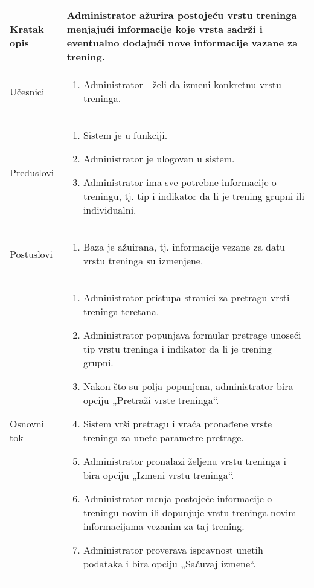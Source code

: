 \documentclass[../main.tex]{subfiles}
\begin{document}
\begin{longtable}{| p{} | p{} |} 

\hline
    Kratak opis &  Administrator ažurira postojeću vrstu treninga menjajući informacije koje vrsta sadrži i eventualno dodajući nove informacije vazane za trening.\\ 
\hline    
    Učesnici & 
    	\begin{enumerate}
        \item Administrator - želi da izmeni konkretnu vrstu treninga.
     \end{enumerate}\\
\hline
   Preduslovi & \begin{enumerate}
       \item Sistem je u funkciji.
       \item Administrator je ulogovan u sistem.
       \item Administrator ima sve potrebne informacije o treningu, tj. tip i indikator da li je trening grupni ili individualni.
   \end{enumerate}\\
\hline  
    Postuslovi & \begin{enumerate}
        \item Baza je ažuirana, tj. informacije vezane za datu vrstu treninga su izmenjene.
    \end{enumerate}\\
\hline
    Osnovni tok & \begin{enumerate}
        \item Administrator pristupa stranici za pretragu vrsti treninga teretana.
        \item Administrator popunjava formular pretrage unoseći tip vrstu treninga i indikator da li je trening grupni.
        \item Nakon što su polja popunjena, administrator bira opciju „Pretraži vrste treninga“.
        \item Sistem vrši pretragu i vraća pronađene vrste treninga za unete parametre pretrage.
        \item Administrator pronalazi željenu vrstu treninga i bira opciju „Izmeni vrstu treninga“.
        \item Administrator menja postojeće informacije o treningu novim ili dopunjuje vrstu treninga novim informacijama vezanim za taj trening.
        \item Administrator proverava ispravnost unetih podataka i bira opciju „Sačuvaj izmene“.

\end{enumerate}
\end{longtable}
\end{document}
